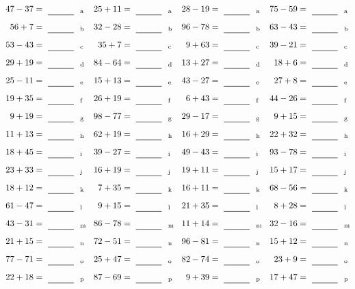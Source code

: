 \documentclass
[
  draft    = true,
  fontsize = 11pt,
  parskip  = half-
]
{scrartcl}
\begin{document}
\clearpage
\begin{align*}
    \pline{47-37}&=\rline{a}
  & \pline{25+11}&=\rline{a}
  & \pline{28-19}&=\rline{a}
  & \pline{75-59}&=\rline{a} \\[1ex]
    \pline{56+7}&=\rline{b}
  & \pline{32-28}&=\rline{b}
  & \pline{96-78}&=\rline{b}
  & \pline{63-43}&=\rline{b} \\[1ex]
    \pline{53-43}&=\rline{c}
  & \pline{35+7}&=\rline{c}
  & \pline{9+63}&=\rline{c}
  & \pline{39-21}&=\rline{c} \\[1ex]
    \pline{29+19}&=\rline{d}
  & \pline{84-64}&=\rline{d}
  & \pline{13+27}&=\rline{d}
  & \pline{18+6}&=\rline{d} \\[1ex]
    \pline{25-11}&=\rline{e}
  & \pline{15+13}&=\rline{e}
  & \pline{43-27}&=\rline{e}
  & \pline{27+8}&=\rline{e} \\[1ex]
    \pline{19+35}&=\rline{f}
  & \pline{26+19}&=\rline{f}
  & \pline{6+43}&=\rline{f}
  & \pline{44-26}&=\rline{f} \\[1ex]
    \pline{9+19}&=\rline{g}
  & \pline{98-77}&=\rline{g}
  & \pline{29-17}&=\rline{g}
  & \pline{9+15}&=\rline{g} \\[1ex]
    \pline{11+13}&=\rline{h}
  & \pline{62+19}&=\rline{h}
  & \pline{16+29}&=\rline{h}
  & \pline{22+32}&=\rline{h} \\[1ex]
    \pline{18+45}&=\rline{i}
  & \pline{39-27}&=\rline{i}
  & \pline{49-43}&=\rline{i}
  & \pline{93-78}&=\rline{i} \\[1ex]
    \pline{23+33}&=\rline{j}
  & \pline{16+19}&=\rline{j}
  & \pline{19+11}&=\rline{j}
  & \pline{15+17}&=\rline{j} \\[1ex]
    \pline{18+12}&=\rline{k}
  & \pline{7+35}&=\rline{k}
  & \pline{16+11}&=\rline{k}
  & \pline{68-56}&=\rline{k} \\[1ex]
    \pline{61-47}&=\rline{l}
  & \pline{9+15}&=\rline{l}
  & \pline{21+35}&=\rline{l}
  & \pline{8+28}&=\rline{l} \\[1ex]
    \pline{43-31}&=\rline{m}
  & \pline{86-78}&=\rline{m}
  & \pline{11+14}&=\rline{m}
  & \pline{32-16}&=\rline{m} \\[1ex]
    \pline{21+15}&=\rline{n}
  & \pline{72-51}&=\rline{n}
  & \pline{96-81}&=\rline{n}
  & \pline{15+12}&=\rline{n} \\[1ex]
    \pline{77-71}&=\rline{o}
  & \pline{25+47}&=\rline{o}
  & \pline{82-74}&=\rline{o}
  & \pline{23+9}&=\rline{o} \\[1ex]
    \pline{22+18}&=\rline{p}
  & \pline{87-69}&=\rline{p}
  & \pline{9+39}&=\rline{p}
  & \pline{17+47}&=\rline{p}
\end{align*}
\end{document}
